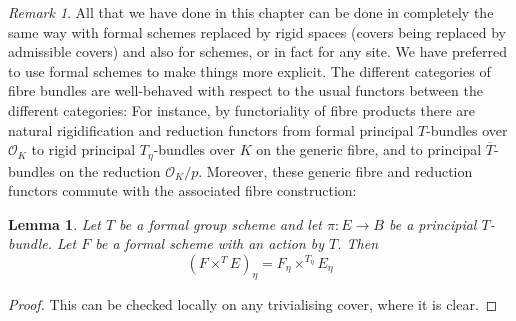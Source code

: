\documentclass[10pt,oneside]{amsart}
\newtheorem{lemma}[theorem]{Lemma}
\theoremstyle{definition}
\theoremstyle{remark}
\newtheorem{remark}[theorem]{Remark}
\begin{document}
	\begin{remark}\label{appendix in the case of rigid spaces and schemes}
	All that we have done in this chapter can be done in completely the same way with formal schemes replaced by rigid spaces (covers being replaced by admissible covers) and also for schemes, or in fact for any site. We have preferred to use formal schemes to make things more explicit. 
	The different categories of fibre bundles are well-behaved with respect to the usual functors between the different categories: For instance, by functoriality of fibre products there are natural rigidification and reduction functors from formal principal $T$-bundles over $\mathcal O_K$ to rigid principal $T_\eta$-bundles over $K$ on the generic fibre, and to principal $\overline{T}$-bundles on the reduction $\mathcal O_K/p$. Moreover, these generic fibre and reduction functors commute with the associated fibre construction:
	\end{remark}
	\begin{lemma}\label{associated bundle commutes with generic fibre}
		Let $T$ be a formal group scheme and let $\pi:E\rightarrow B$ be a principial $T$-bundle. Let $F$ be a formal scheme with an action by $T$. Then
		\[(F\times^T E)_\eta = F_\eta\times^{T_\eta} E_\eta \]
	\end{lemma}
	\begin{proof}
		This can be checked locally on any trivialising cover, where it is clear.
	\end{proof}
	
\end{document}
